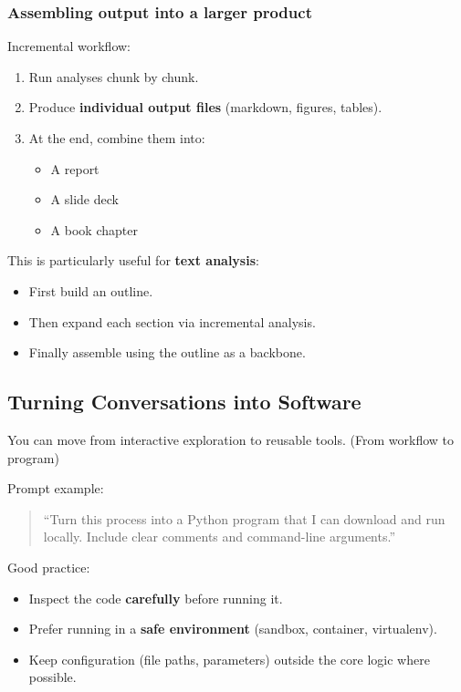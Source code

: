 \documentclass[
  letterpaper,
  DIV=11,
  numbers=noendperiod]{scrreprt}
\providecommand{\tightlist}{%
  \setlength{\itemsep}{0pt}\setlength{\parskip}{0pt}}
\begin{document}
\subsubsection{Assembling output into a larger
product}\label{assembling-output-into-a-larger-product}

Incremental workflow:

\begin{enumerate}
\def\labelenumi{\arabic{enumi}.}
\tightlist
\item
  Run analyses chunk by chunk.
\item
  Produce \textbf{individual output files} (markdown, figures, tables).
\item
  At the end, combine them into:

  \begin{itemize}
  \tightlist
  \item
    A report
  \item
    A slide deck
  \item
    A book chapter
  \end{itemize}
\end{enumerate}

This is particularly useful for \textbf{text analysis}:

\begin{itemize}
\tightlist
\item
  First build an outline.
\item
  Then expand each section via incremental analysis.
\item
  Finally assemble using the outline as a backbone.
\end{itemize}

\subsection{Turning Conversations into
Software}\label{turning-conversations-into-software}

You can move from interactive exploration to reusable tools. (From
workflow to program)

Prompt example:

\begin{quote}
``Turn this process into a Python program that I can download and run
locally. Include clear comments and command-line arguments.''
\end{quote}

Good practice:

\begin{itemize}
\tightlist
\item
  Inspect the code \textbf{carefully} before running it.
\item
  Prefer running in a \textbf{safe environment} (sandbox, container,
  virtualenv).
\item
  Keep configuration (file paths, parameters) outside the core logic
  where possible.
\end{itemize}
\end{document}

